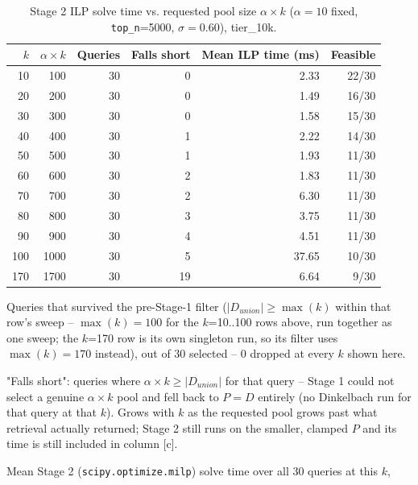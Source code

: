
\begin{table}[t]
\centering
\begin{threeparttable}
\caption{Stage 2 ILP solve time vs. requested pool size $\alpha{\times}k$ ($\alpha=10$ fixed,
\texttt{top\_n}=5000, $\sigma=0.60$), tier\_10k.}
\label{tab:wdc-ilp-scaling-tier10k}
\begin{tabular}{rrrrrr}
\toprule
$k$ & $\alpha{\times}k$ & Queries\tnote{a} & Falls short\tnote{b} & Mean ILP time (ms)\tnote{c} & Feasible\tnote{d} \\
\midrule
 10 &  100 & 30 & 0 &  2.33 & 22/30 \\
 20 &  200 & 30 & 0 &  1.49 & 16/30 \\
 30 &  300 & 30 & 0 &  1.58 & 15/30 \\
 40 &  400 & 30 & 1 &  2.22 & 14/30 \\
 50 &  500 & 30 & 1 &  1.93 & 11/30 \\
 60 &  600 & 30 & 2 &  1.83 & 11/30 \\
 70 &  700 & 30 & 2 &  6.30 & 11/30 \\
 80 &  800 & 30 & 3 &  3.75 & 11/30 \\
 90 &  900 & 30 & 4 &  4.51 & 11/30 \\
100 & 1000 & 30 & 5 & 37.65\tnote{e} & 10/30 \\
170\tnote{f} & 1700 & 30 & 19 & 6.64 & 9/30 \\
\bottomrule
\end{tabular}
\begin{tablenotes}
\footnotesize
\item[a] Queries that survived the pre-Stage-1 filter ($|D_{union}| \geq \max(k)$ within that row's
  sweep -- $\max(k)=100$ for the $k$=10..100 rows above, run together as one sweep; the $k$=170 row
  is its own singleton run, so its filter uses $\max(k)=170$ instead), out of 30 selected -- 0
  dropped at every $k$ shown here.
\item[b] "Falls short": queries where $\alpha{\times}k \geq |D_{union}|$ for that query -- Stage 1
  could not select a genuine $\alpha{\times}k$ pool and fell back to $P=D$ entirely (no Dinkelbach
  run for that query at that $k$). Grows with $k$ as the requested pool grows past what retrieval
  actually returned; Stage 2 still runs on the smaller, clamped $P$ and its time is still included
  in column [c].
\item[c] Mean Stage 2 (\texttt{scipy.optimize.milp}) solve time over all 30 queries at this $k$,

\end{tablenotes}
\end{threeparttable}
\end{table}
